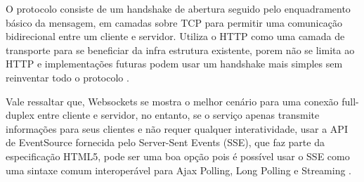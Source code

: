 O protocolo consiste de um handshake de abertura seguido pelo enquadramento básico da mensagem, em camadas sobre TCP para permitir uma comunicação bidirecional entre um cliente e servidor. Utiliza o HTTP como uma camada de transporte para se beneficiar da infra estrutura existente, porem não se limita ao HTTP e implementações futuras podem usar um handshake mais simples sem reinventar todo o protocolo \citep{Saint-Andre2011}.

Vale ressaltar que, Websockets se mostra o melhor cenário para uma conexão full-duplex entre cliente e servidor, no entanto, se o serviço apenas transmite informações para seus clientes e não requer qualquer interatividade, usar a API de EventSource fornecida pelo Server-Sent Events (SSE), que faz parte da especificação HTML5, pode ser uma boa opção pois é possível usar o SSE como uma sintaxe comum interoperável para Ajax Polling, Long Polling e Streaming \citep[p.~10-11]{Wang2013}.